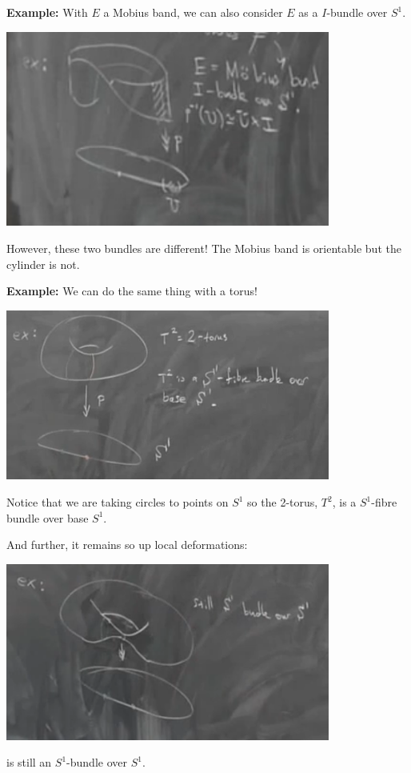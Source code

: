 \documentclass[12pt]{article}
\begin{document}
    \textbf{Example:} With $E$ a Mobius band, we can also consider $E$ as a $I$-bundle over $S^1$.

    \begin{center}
        \includegraphics[width=0.8\textwidth]{Images/April 16 - Mobius bundle.png}
    \end{center}

    However, these two bundles are different! The Mobius band is orientable but the cylinder is not. 

    \textbf{Example:} We can do the same thing with a torus! 

    \begin{center}
        \includegraphics[width=0.8\textwidth]{Images/April 16 - Torus bundle.png}
    \end{center}

    Notice that we are taking circles to points on $S^1$ so the 2-torus, $T^2$, is a $S^1$-fibre bundle over base $S^1$.

    And further, it remains so up local deformations: 
    \begin{center}
        \includegraphics[width=0.8\textwidth]{Images/April 16 - Pinched torus bundle.png}
    \end{center}
    is still an $S^1$-bundle over $S^1$.
\end{document}
